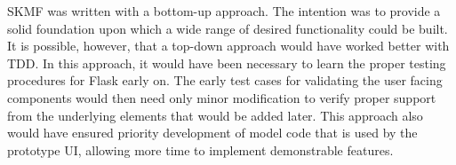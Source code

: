 SKMF was written with a bottom-up approach. The intention was to provide a solid foundation upon which a wide range of desired functionality could be built. It is possible, however, that a top-down approach would have worked better with TDD. In this approach, it would have been necessary to learn the proper testing procedures for Flask early on. The early test cases for validating the user facing components would then need only minor modification to verify proper support from the underlying elements that would be added later. This approach also would have ensured priority development of model code that is used by the prototype UI, allowing more time to implement demonstrable features.
